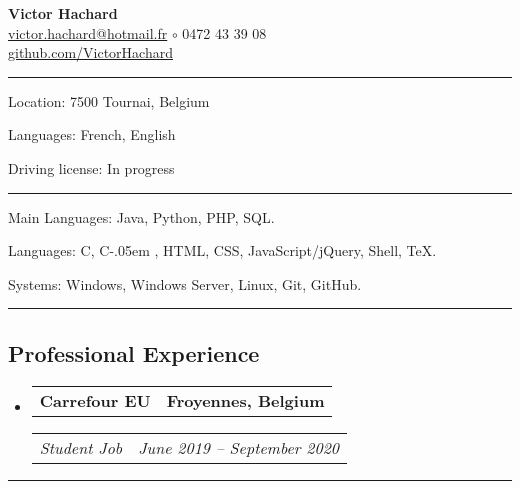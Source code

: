 \documentclass[10pt,letterpaper]{article}
\makeatletter
\newcommand{\Csharp}{%
  {\settoheight{\dimen0}{C}C\kern-.05em \resizebox{!}{\dimen0}{\raisebox{\depth}{\#}}}}
\newenvironment{indentsection}[1]
{\begin{list}{}
  {\setlength{\leftmargin}{#1}} \item[]
}
{\end{list}}
\newcommand{\headerrow}[2]
{\begin{tabular*}{\linewidth}{l@{\extracolsep{\fill}}r}
  #1 &
  #2 \\
\end{tabular*}}
\makeatother
\begin{document}
\begin{center}
  \huge \textbf{Victor Hachard} \\
  \large
  \href{mailto:victor.hachard@hotmail.fr}{victor.hachard@hotmail.fr}
  $\circ$
  0472 43 39 08
  \\
  \href{http://www.github.com/VictorHachard}{github.com/VictorHachard}
  \vspace{-0.2em}
\end{center}


\hrule
\begin{indentsection}{\parindent}
\begin{description*}
  \item[Location:] 7500 Tournai, Belgium
  \item[Languages:] French, English
  \item[Driving license:] In progress
\end{description*}
\end{indentsection}


\hrule
\begin{indentsection}{\parindent}
\begin{description*}
  \item[Main Languages:] Java, Python, PHP, SQL.
  \item[Languages:] C, \Csharp, HTML, CSS, JavaScript/jQuery, Shell, TeX.
  \item[Systems:] Windows, Windows Server, Linux, Git, GitHub.
\end{description*}
\end{indentsection}


\hrule
\vspace{-0.4em}
\subsection*{Professional Experience}
\begin{itemize}
  \parskip=0.1em

  \item
  \headerrow
    {\textbf{Carrefour EU}}
    {\textbf{Froyennes, Belgium}}
  \headerrow
    {\emph{Student Job}}
    {\emph{June 2019 -- September 2020}}
  \end{itemize}


\hrule
\vspace{-0.4em}
\end{document}
